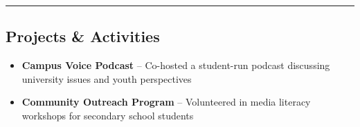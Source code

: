 \documentclass[11pt,letterpaper]{article}
\begin{document}
\vspace{0.2cm}
\hrule
\vspace{0.2cm}

\subsection*{Projects \& Activities}

\begin{itemize}[leftmargin=1em, itemsep=3pt, label=\textbullet]
  \item \textbf{Campus Voice Podcast} – Co-hosted a student-run podcast discussing university issues and youth perspectives
  \item \textbf{Community Outreach Program} – Volunteered in media literacy workshops for secondary school students
\end{itemize}
\end{document}
